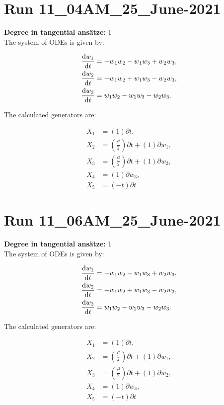 \section*{Run 11\_04AM\_25\_June-2021}
\textbf{Degree in tangential ansätze:}	1\\
The system of ODEs is given by:

\begin{align*}
\dv{w_{1}}{t}&=- w_{1} w_{2} - w_{1} w_{3} + w_{2} w_{3},\\
\dv{w_{2}}{t}&=- w_{1} w_{2} + w_{1} w_{3} - w_{2} w_{3},\\
\dv{w_{3}}{t}&=w_{1} w_{2} - w_{1} w_{3} - w_{2} w_{3}.\\
\end{align*}

\noindent The calculated generators are:

\begin{align*}
X_{1}&=\left( 1 \right)\partial t,\\
X_{2}&=\left( \frac{t^{2}}{2} \right)\partial t+\left( 1 \right)\partial w_{1},\\
X_{3}&=\left( \frac{t^{2}}{2} \right)\partial t+\left( 1 \right)\partial w_{2},\\
X_{4}&=\left( 1 \right)\partial w_{3},\\
X_{5}&=\left( - t \right)\partial t\end{align*}
\section*{Run 11\_06AM\_25\_June-2021}
\textbf{Degree in tangential ansätze:}	1\\
The system of ODEs is given by:

\begin{align*}
\dv{w_{1}}{t}&=- w_{1} w_{2} - w_{1} w_{3} + w_{2} w_{3},\\
\dv{w_{2}}{t}&=- w_{1} w_{2} + w_{1} w_{3} - w_{2} w_{3},\\
\dv{w_{3}}{t}&=w_{1} w_{2} - w_{1} w_{3} - w_{2} w_{3}.\\
\end{align*}

\noindent The calculated generators are:

\begin{align*}
X_{1}&=\left( 1 \right)\partial t,\\
X_{2}&=\left( \frac{t^{2}}{2} \right)\partial t+\left( 1 \right)\partial w_{1},\\
X_{3}&=\left( \frac{t^{2}}{2} \right)\partial t+\left( 1 \right)\partial w_{2},\\
X_{4}&=\left( 1 \right)\partial w_{3},\\
X_{5}&=\left( - t \right)\partial t\end{align*}
